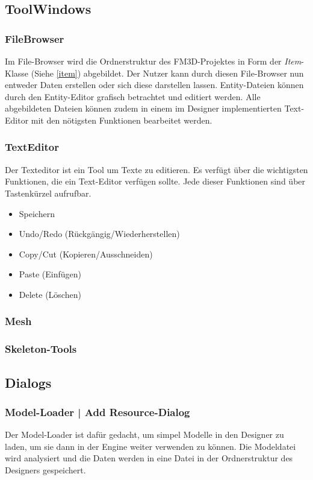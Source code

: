 \subsection{ToolWindows}
\subsubsection{FileBrowser}
\label{filebrowser}
Im File-Browser wird die Ordnerstruktur des FM3D-Projektes in Form der \textit{Item}-Klasse (Siehe \cref{item}) abgebildet. Der Nutzer kann durch diesen File-Browser nun entweder Daten erstellen oder sich diese darstellen lassen. Entity-Dateien können durch den Entity-Editor grafisch betrachtet und editiert werden. Alle abgebildeten Dateien können zudem in einem im Designer implementierten Text-Editor mit den nötigsten Funktionen bearbeitet werden.

\subsubsection{TextEditor}
Der Texteditor ist ein Tool um Texte zu editieren.  Es verfügt über die wichtigsten Funktionen, die ein Text-Editor verfügen sollte. Jede dieser Funktionen sind über Tastenkürzel aufrufbar.
\begin{itemize}
	\item Speichern
	\item Undo/Redo (Rückgängig/Wiederherstellen)
	\item Copy/Cut (Kopieren/Ausschneiden)
	\item Paste (Einfügen)
	\item Delete (Löschen)
\end{itemize}

\subsubsection{Mesh}
\subsubsection{Skeleton-Tools}

\subsection{Dialogs}
\subsubsection{Model-Loader | Add Resource-Dialog}
Der Model-Loader ist dafür gedacht, um simpel Modelle in den Designer zu laden, um sie dann in der Engine weiter verwenden zu können. Die Modeldatei wird analysiert und die Daten werden in eine Datei in der Ordnerstruktur des Designers gespeichert.
\todo[inline]{!!!}

